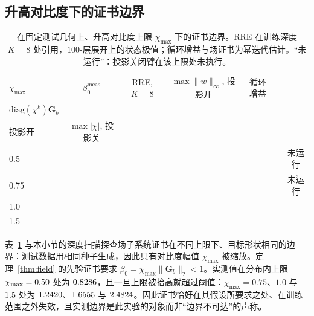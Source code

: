 \documentclass[UTF8,a4paper,11pt]{ctexart}
\newcommand{\norm}[1]{\lVert #1 \rVert}
\newcommand{\numv}[1]{#1}
\begin{document}
\subsection{升高对比度下的证书边界}
\label{sec:contrast}

\begin{table}[htbp]
\centering
\caption{在固定测试几何上、升高对比度上限 $\chi_{\max}$ 下的证书边界。RRE 在训练深度 $K=8$ 处引用，$100$-层展开上的状态极值；循环增益与场证书为幂迭代估计。“未运行”：投影关闭臂在该上限处未执行。}
\label{tab:contrast}
\small
\setlength{\tabcolsep}{4pt}
\begin{tabular}{lcccccc}
\toprule
$\chi_{\max}$ & $\beta_0^{\mathrm{meas}}$ & RRE, $K=8$ & $\max\|w\|_\infty$, 投影开 & 循环增益 & \shortstack{$\sup_k\sigma_{\max}$\\$\mathrm{diag}(\chi^k)\mathbf G_b$\\投影开} & $\max|\chi|$, 投影关 \\
\midrule
0.5  & \numv{\NumBetaZeroFive}  & \numv{\NumRreZeroFive}  & \numv{\NumMaxWZeroFive}  & \numv{\NumCycGainZeroFive}  & \numv{\NumFieldSubCertZeroFive}  & 未运行 \\
0.75 & \numv{\NumBetaSevenFive} & \numv{\NumRreSevenFive} & \numv{\NumMaxWSevenFive} & \numv{\NumCycGainSevenFive} & \numv{\NumFieldSubCertSevenFive} & 未运行 \\
1.0  & \numv{\NumBetaOneZero}  & \numv{\NumRreOneZero}  & \numv{\NumMaxWOneZero}  & \numv{\NumCycGainOneZero}  & \numv{\NumFieldSubCertOneZero}  & \numv{\NumProjOffChiOneZero} \\
1.5  & \numv{\NumBetaOneFive}  & \numv{\NumRreOneFive}  & \numv{\NumMaxWOneFive}  & \numv{\NumCycGainOneFive}  & \numv{\NumFieldSubCertOneFive}  & \numv{\NumProjOffChiOneFive} \\
\bottomrule
\end{tabular}
\end{table}

表~\ref{tab:contrast} 与本小节的深度扫描探查场子系统证书在不同上限下、目标形状相同的边界：测试数据用相同种子生成，因此只有对比度幅值 $\chi_{\max}$ 被缩放。定理~\ref{thm:field} 的先验证书要求 $\beta_0=\chi_{\max}\norm{\mathbf{G}_b}_2<1$。实测值在分布内上限 $\chi_{\max}=\numv{\NumMaxChiBox}$ 处为 $\numv{\NumBetaZeroFive}$，且一旦上限被抬高就超过阈值：$\chi_{\max}=0.75$、$1.0$ 与 $1.5$ 处为 $\numv{\NumBetaSevenFive}$、$\numv{\NumBetaOneZero}$ 与 $\numv{\NumBetaOneFive}$。因此证书恰好在其假设所要求之处、在训练范围之外失效，且实测边界是此实验的对象而非“边界不可达”的声称。
\end{document}
